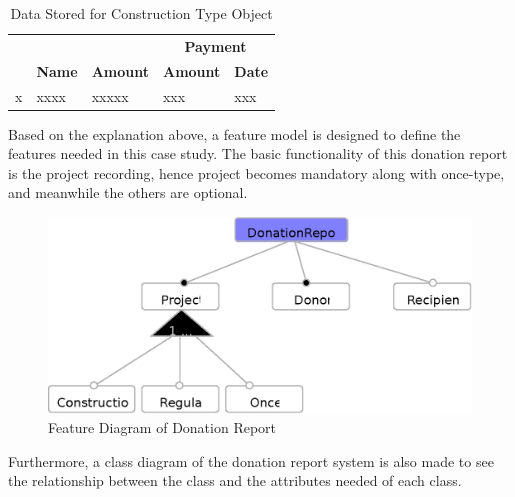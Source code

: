 \documentclass[runningheads,a4paper]{llncs}
\begin{document}
\begin{table}[]
	\centering
	\caption{Data Stored for Construction Type Object}
	\label{my-label}
	\begin{tabular}{|c|c|c|c|l|}
		\hline
		\rowcolor[HTML]{C0C0C0} 
		\cellcolor[HTML]{C0C0C0}                              & \cellcolor[HTML]{C0C0C0}                                & \cellcolor[HTML]{C0C0C0}                                  & \multicolumn{2}{c|}{\cellcolor[HTML]{C0C0C0}\textbf{Payment}}                         \\ \cline{4-5} 
		\rowcolor[HTML]{C0C0C0} 
		\multirow{-2}{*}{\cellcolor[HTML]{C0C0C0}\textbf{Id}} & \multirow{-2}{*}{\cellcolor[HTML]{C0C0C0}\textbf{Name}} & \multirow{-2}{*}{\cellcolor[HTML]{C0C0C0}\textbf{Amount}} & \textbf{Amount}          & \multicolumn{1}{c|}{\cellcolor[HTML]{C0C0C0}\textbf{Date}} \\ \hline
		\multicolumn{1}{|l|}{x}                               & \multicolumn{1}{l|}{xxxx}                               & \multicolumn{1}{l|}{xxxxx}                                & \multicolumn{1}{l|}{xxx} & xxx                                                        \\ \hline
	\end{tabular}
\end{table}

Based on the explanation above, a feature model is designed to define the features needed in this case study. The basic functionality of this donation report is the project recording, hence project becomes mandatory along with once-type, and meanwhile the others are optional.

\begin{figure}
	\centering
	\includegraphics[scale=0.65]{FeatureDiagram.eps}
	\caption{Feature Diagram of Donation Report}
	\label{feature diagram}
\end{figure}

Furthermore, a class diagram of the donation report system is also made to see the relationship between the class and the attributes needed of each class. 
\end{document}
